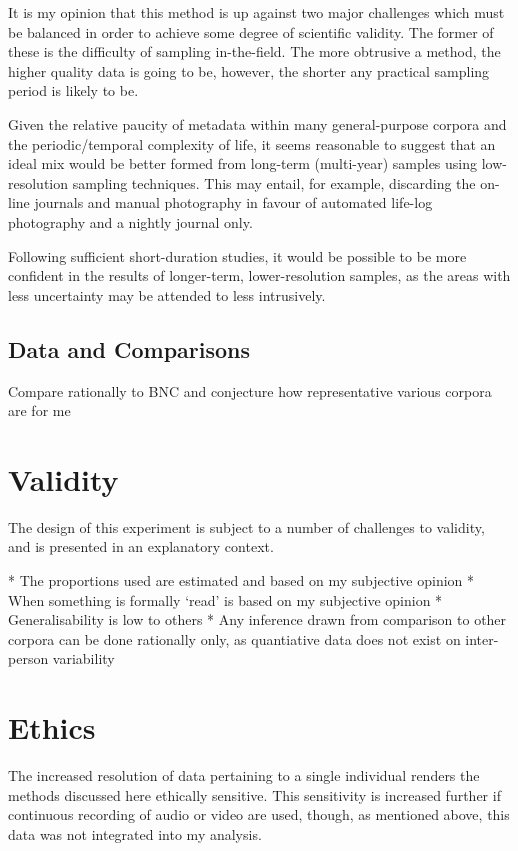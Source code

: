 It is my opinion that this method is up against two major challenges which must be balanced in order to achieve some degree of scientific validity.  The former of these is the difficulty of sampling in-the-field.  The more obtrusive a method, the higher quality data is going to be, however, the shorter any practical sampling period is likely to be.

Given the relative paucity of metadata within many general-purpose corpora and the periodic/temporal complexity of life, it seems reasonable to suggest that an ideal mix would be better formed from long-term (multi-year) samples using low-resolution sampling techniques.  This may entail, for example, discarding the on-line journals and manual photography in favour of automated life-log photography and a nightly journal only.

Following sufficient short-duration studies, it would be possible to be more confident in the results of longer-term, lower-resolution samples, as the areas with less uncertainty may be attended to less intrusively.







\subsection{Data and Comparisons}
Compare rationally to BNC and conjecture how representative various corpora are for me







\section{Validity}
The design of this experiment is subject to a number of challenges to validity, and is presented in an explanatory context.

* The proportions used are estimated and based on my subjective opinion
* When something is formally `read' is based on my subjective opinion
* Generalisability is low to others
* Any inference drawn from comparison to other corpora can be done rationally only, as quantiative data does not exist on inter-person variability



\section{Ethics}
The increased resolution of data pertaining to a single individual renders the methods discussed here ethically sensitive.  This sensitivity is increased further if continuous recording of audio or video are used, though, as mentioned above, this data was not integrated into my analysis.

